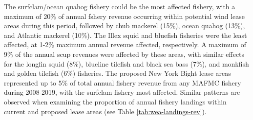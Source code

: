 \documentclass[
  10pt,
]{article}
\let\origtable\table
\let\endorigtable\endtable
\renewenvironment{table}[1][2] {
    \expandafter\origtable\expandafter[H]
} {
    \endorigtable
}
\begin{document}
The surfclam/ocean quahog fishery could be the most affected fishery,
with a maximum of 20\% of annual fshery revenue occurring within
potential wind lease areas during this period, followed by chub mackerel
(15\%), ocean quahog (13\%), and Atlantic mackerel (10\%). The Illex
squid and bluefish fisheries were the least affected, at 1-2\% maximum
annual revenue affected, respectively. A maximum of 9\% of the annual
scup revenues were affected by these areas, with similar effects for the
longfin squid (8\%), blueline tilefish and black sea bass (7\%), and
monkfish and golden tilefish (6\%) fisheries. The proposed New York
Bight lease areas represented up to 5\% of total annual fishery revenue
from any MAFMC fishery during 2008-2019, with the surfclam fishery most
affected. Similar patterns are observed when examining the proportion of
annual fishery landings within current and proposed lease areas (see
Table \ref{tab:wea-landings-rev}).

\begin{table}

\caption{\label{tab:wea-landings-rev}Top ten species Landings and Revenue from Wind Energy Areas.}
\centering
{}
\end{table}
\end{document}
